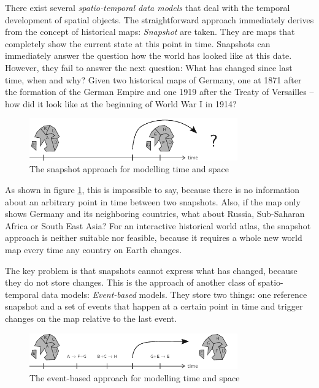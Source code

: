 There exist several \emph{spatio-temporal data models} that deal with the temporal development of spatial objects. The straightforward approach immediately derives from the concept of historical maps: \emph{Snapshot} are taken. They are maps that completely show the current state at this point in time. Snapshots can immediately answer the question how the world has looked like at this date. However, they fail to answer the next question: What has changed since last time, when and why? Given two historical maps of Germany, one at 1871 after the formation of the German Empire and one 1919 after the Treaty of Versailles -- how did it look like at the beginning of World War I in 1914?

\begin{figure}[ht]
  \vspace{1em}
  \centering
  \includegraphics[width=0.8\textwidth]{graphics/introduction/snapshot_approach}
  \caption{The snapshot approach for modelling time and space}
  \label{fig:snapshot_approach}
\end{figure}

As shown in figure \ref{fig:snapshot_approach}, this is impossible to say, because there is no information about an arbitrary point in time between two snapshots. Also, if the map only shows Germany and its neighboring countries, what about Russia, Sub-Saharan Africa or South East Asia? For an interactive historical world atlas, the snapshot approach is neither suitable nor feasible, because it requires a whole new world map every time any country on Earth changes.

The key problem is that snapshots cannot express what has changed, because they do not store changes. This is the approach of another class of spatio-temporal data models: \emph{Event-based} models. They store two things: one reference snapshot and a set of events that happen at a certain point in time and trigger changes on the map relative to the last event.

\begin{figure}[ht]
  \vspace{1em}
  \centering
  \includegraphics[width=0.8\textwidth]{graphics/introduction/event_based_approach}
  \caption{The event-based approach for modelling time and space}
  \label{fig:event_based_approach}
\end{figure}

